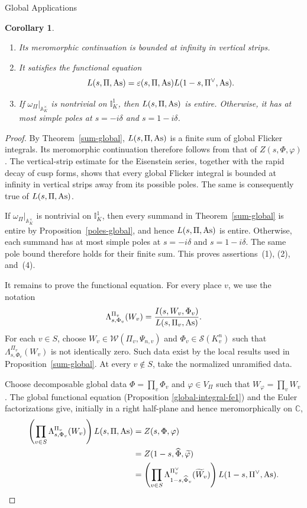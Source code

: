 \documentclass[12pt,reqno]{amsart}
\numberwithin{equation}{section}%
\numberwithin{equation}{subsection}
\newtheorem{corollarySubsec}[equation]{Corollary}
\theoremstyle{definition}
\theoremstyle{remark}
\begin{document}
\begin{section}{Global Applications}
\begin{corollarySubsec}
\begin{enumerate}
    \item Its meromorphic continuation is bounded at infinity in
    vertical strips.

    \item It satisfies the functional equation
    \[
    L(s,\Pi,{\rm As})
    =
    \varepsilon(s,\Pi,{\rm As})
    L(1-s,\Pi^\vee,{\rm As}).
    \]

    \item If
    \(\left.\omega_\Pi\right|_{\mathbb{A}_K^\times}\)
    is nontrivial on \(\mathbb{I}_K^1\), then
    \(L(s,\Pi,{\rm As})\) is entire. Otherwise, it has at most simple poles
    at \(s=-i\delta\) and \(s=1-i\delta\).
\end{enumerate}
\end{corollarySubsec}

\begin{proof}
By Theorem~\ref{sum-global}, \(L(s,\Pi,{\rm As})\) is a finite sum of
global Flicker integrals. Its meromorphic continuation therefore
follows from that of \(Z(s,\Phi,\varphi)\). The vertical-strip estimate
for the Eisenstein series, together with the rapid decay of cusp forms,
shows that every global Flicker integral is bounded at infinity in
vertical strips away from its possible poles. The same is consequently
true of \(L(s,\Pi,{\rm As})\).

If
\(\left.\omega_\Pi\right|_{\mathbb{A}_K^\times}\)
is nontrivial on \(\mathbb{I}_K^1\), then every summand in
Theorem~\ref{sum-global} is entire by
Proposition~\ref{poles-global}, and hence \(L(s,\Pi,{\rm As})\) is entire.
Otherwise, each summand has at most simple poles at
\(s=-i\delta\) and \(s=1-i\delta\). The same pole bound therefore holds
for their finite sum. This proves assertions~(1), (2), and~(4).

It remains to prove the functional equation. For every place \(v\), we
use the notation
\[
\Lambda_{s,\Phi_v}^{\Pi_v}(W_v)
=
\frac{I(s,W_v,\Phi_v)}
     {L(s,\Pi_v,{\rm As})}.
\]
For each \(v\in S\), choose
$W_v\in\mathcal{W}(\Pi_v,\Psi_{n,v})$
 and 
$\Phi_v\in\mathcal{S}(K_v^n)$
such that
\(\Lambda_{s,\Phi_v}^{\Pi_v}(W_v)\) is not identically zero. Such data
exist by the local results used in
Proposition~\ref{sum-global}. At every \(v\notin S\), take the
normalized unramified data.

Choose decomposable global data \(\Phi=\prod_v\Phi_v\) and
\(\varphi\in V_\Pi\) such that
\(W_\varphi=\prod_vW_v\). The global functional equation (Proposition \ref{global-integral-fe1}) and the
Euler factorizations give, initially in a right half-plane and hence
meromorphically on \(\mathbb{C}\),
\[
\begin{aligned}
\left(
\prod_{v\in S}
\Lambda_{s,\Phi_v}^{\Pi_v}(W_v)
\right)
L(s,\Pi,{\rm As})
&=
Z(s,\Phi,\varphi)\\
&=
Z(1-s,\widehat{\Phi},\widetilde{\varphi})\\
&=
\left(
\prod_{v\in S}
\Lambda_{1-s,\widehat{\Phi}_v}^{\Pi_v^\vee}
(\widetilde W_v)
\right)
L(1-s,\Pi^\vee,{\rm As}).
\end{aligned}
\]


\end{proof}
\end{section}
\end{document}
